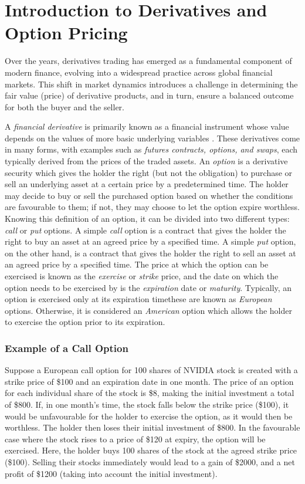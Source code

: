 \section{Introduction to Derivatives and Option Pricing}
Over the years, derivatives trading has emerged as a fundamental component of modern finance,
evolving into a widespread practice across global financial markets. This shift in market dynamics
introduces a challenge in determining the fair value (price) of derivative products, and in turn,
ensure a balanced outcome for both the buyer and the seller.

A \textit{financial derivative} is primarily known as a financial instrument whose value depends on the
values of more basic underlying variables \cite{hull_2021_options}. These derivatives come in many forms,
with examples such as \textit{futures contracts, options, and swaps}, each typically derived from the prices of
the traded assets. An \textit{option} is a derivative security which gives the holder the right (but not the obligation) 
to purchase or sell an underlying asset at a certain price by a predetermined time. The holder may decide to buy or sell
the purchased option based on whether the conditions are favourable to them; if not, they may choose to let the option expire worthless. 
Knowing this definition of an option, it can be divided into two different types: \textit{call} or \textit{put} options. A simple \textit{call} option 
is a contract that gives the holder the right to buy an asset at an agreed price by a specified time. A simple \textit{put} 
option, on the other hand, is a contract that gives the holder the right to sell an asset at an agreed price by a specified time.
The price at which the option can be exercised is known as the \textit{exercise} or \textit{strike} price, and the date on which
the option needs to be exercised by is the \textit{expiration} date or \textit{maturity}. Typically, an option is exercised only at
its expiration time\textemdash these are known as \textit{European} options. Otherwise, it is considered an \textit{American} option
which allows the holder to exercise the option prior to its expiration.
\subsubsection{Example of a Call Option} 
Suppose a European call option for 100 shares of NVIDIA stock is created with a strike price of \$100 and an expiration date in one month. 
The price of an option for each individual share of the stock is \$8, making the initial investment a total of \$800. If, in one month's time,
the stock falls below the strike price (\$100), it would be unfavourable for the holder to exercise the option, as it would then be worthless.
The holder then loses their initial investment of \$800. In the favourable case where the stock rises to a price of \$120 at expiry, the option
will be exercised. Here, the holder buys 100 shares of the stock at the agreed strike price (\$100). Selling their stocks immediately would 
lead to a gain of \$2000, and a net profit of \$1200 (taking into account the initial investment).
